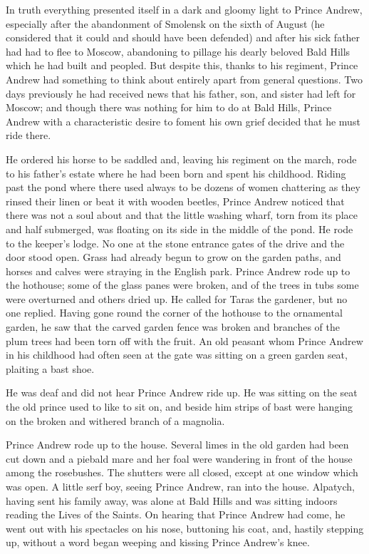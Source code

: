In truth everything presented itself in a dark and gloomy light
to Prince Andrew, especially after the abandonment of Smolensk on
the sixth of August (he considered that it could and should have
been defended) and after his sick father had had to flee to
Moscow, abandoning to pillage his dearly beloved Bald Hills which
he had built and peopled.  But despite this, thanks to his
regiment, Prince Andrew had something to think about entirely
apart from general questions. Two days previously he had received
news that his father, son, and sister had left for Moscow; and
though there was nothing for him to do at Bald Hills, Prince
Andrew with a characteristic desire to foment his own grief
decided that he must ride there.

He ordered his horse to be saddled and, leaving his regiment on
the march, rode to his father's estate where he had been born and
spent his childhood. Riding past the pond where there used always
to be dozens of women chattering as they rinsed their linen or
beat it with wooden beetles, Prince Andrew noticed that there was
not a soul about and that the little washing wharf, torn from its
place and half submerged, was floating on its side in the middle
of the pond. He rode to the keeper's lodge. No one at the stone
entrance gates of the drive and the door stood open. Grass had
already begun to grow on the garden paths, and horses and calves
were straying in the English park. Prince Andrew rode up to the
hothouse; some of the glass panes were broken, and of the trees
in tubs some were overturned and others dried up. He called for
Taras the gardener, but no one replied. Having gone round the
corner of the hothouse to the ornamental garden, he saw that the
carved garden fence was broken and branches of the plum trees had
been torn off with the fruit. An old peasant whom Prince Andrew
in his childhood had often seen at the gate was sitting on a
green garden seat, plaiting a bast shoe.

He was deaf and did not hear Prince Andrew ride up. He was
sitting on the seat the old prince used to like to sit on, and
beside him strips of bast were hanging on the broken and withered
branch of a magnolia.

Prince Andrew rode up to the house. Several limes in the old
garden had been cut down and a piebald mare and her foal were
wandering in front of the house among the rosebushes. The
shutters were all closed, except at one window which was open. A
little serf boy, seeing Prince Andrew, ran into the
house. Alpatych, having sent his family away, was alone at Bald
Hills and was sitting indoors reading the Lives of the Saints. On
hearing that Prince Andrew had come, he went out with his
spectacles on his nose, buttoning his coat, and, hastily stepping
up, without a word began weeping and kissing Prince Andrew's
knee.

